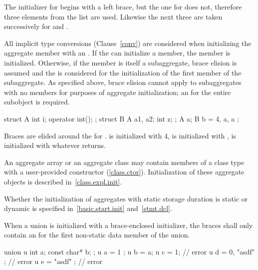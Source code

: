 The initializer for
begins with a left brace, but the one for
does not,
therefore three elements from the list are used.
Likewise the next three are taken successively for
and
.
\exitexample

\pnum
All implicit type conversions (Clause~\ref{conv}) are considered when
initializing the aggregate member with an .
If the
can initialize a member, the member is initialized.
Otherwise, if the member is itself a subaggregate,
brace elision is assumed and the
is considered for the initialization of the first member of the subaggregate.
\enternote As specified above, brace elision cannot apply to
subaggregates with no members for purposes of aggregate initialization; an
 for the entire subobject is
required.\exitnote

\enterexample

\begin{codeblock}
struct A {
  int i;
  operator int();
};
struct B {
  A a1, a2;
  int z;
};
A a;
B b = { 4, a, a };
\end{codeblock}

Braces are elided around the
for
.
is initialized with 4,
is initialized with
,
is initialized with whatever
returns.
\exitexample

\pnum
{}%
\enternote
An aggregate array or an aggregate class may contain members of a
class type with a user-provided constructor (\ref{class.ctor}).
Initialization of these aggregate objects is described in~\ref{class.expl.init}.
\exitnote

\pnum
\enternote Whether the initialization of aggregates with static storage duration is static or dynamic is specified in~\ref{basic.start.init} and~\ref{stmt.dcl}. \exitnote

\pnum
{}%
When a union is initialized with a brace-enclosed initializer,
the braces shall only contain an
for the first non-static data member of the union.
\enterexample

\begin{codeblock}
union u { int a; const char* b; };
u a = { 1 };
u b = a;
u c = 1;                        // error
u d = { 0, "asdf" };            // error
u e = { "asdf" };               // error
\end{codeblock}
\exitexample

